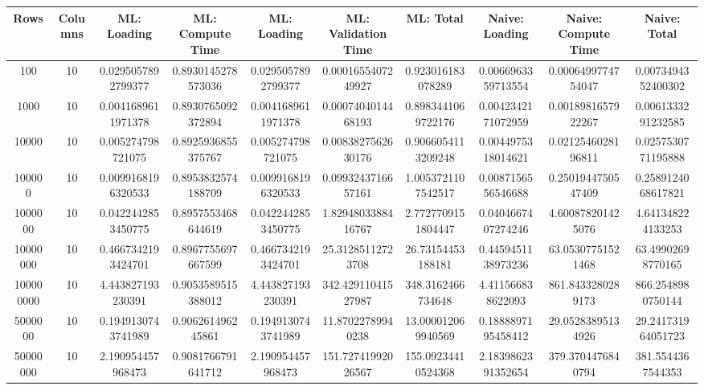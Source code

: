 \begin{table}[htb]
    \centering
    \begin{tabular}{@{}cccccccccc@{}}
        \toprule
        Rows & Columns & ML: Loading & ML: Compute Time & ML: Loading & ML: Validation Time & ML: Total & Naive: Loading & Naive: Compute Time & Naive: Total \\
        \midrule
        100 & 10 & 0.0295057892799377 & 0.8930145278573036 & 0.0295057892799377 & 0.0001655407249927 & 0.923016183078289 & 0.0066963359713554 & 0.0006499774754047 & 0.0073494352400302 \\
        1000 & 10 & 0.0041689611971378 & 0.8930765092372894 & 0.0041689611971378 & 0.0007404014468193 & 0.8983441069722176 & 0.0042342171072959 & 0.0018981657922267 & 0.0061333291232585 \\
        10000 & 10 & 0.005274798721075 & 0.8925936855375767 & 0.005274798721075 & 0.0083827562630176 & 0.9066054113209248 & 0.0044975318014621 & 0.0212546028196811 & 0.0257530771195888 \\
        100000 & 10 & 0.0099168196320533 & 0.8953832574188709 & 0.0099168196320533 & 0.0993243716657161 & 1.0053721107542517 & 0.0087156556546688 & 0.2501944750547409 & 0.2589124068617821 \\
        1000000 & 10 & 0.0422442853450775 & 0.8957553468644619 & 0.0422442853450775 & 1.8294803388416767 & 2.7727709151804447 & 0.0404667407274246 & 4.600878201425076 & 4.641348224133253 \\
        10000000 & 10 & 0.4667342193424701 & 0.8967755697667599 & 0.4667342193424701 & 25.31285112723708 & 26.73154453188181 & 0.4459451138973236 & 63.05307751521468 & 63.49902698770165 \\
        100000000 & 10 & 4.443827193230391 & 0.9053589515388012 & 4.443827193230391 & 342.42911041527987 & 348.3162466734648 & 4.411566838622093 & 861.8433280289173 & 866.2548980750144 \\
        5000000 & 10 & 0.1949130743741989 & 0.906261496245861 & 0.1949130743741989 & 11.87022789940238 & 13.000012069940569 & 0.1888897195458412 & 29.05283895134926 & 29.241731964051723 \\
        50000000 & 10 & 2.190954457968473 & 0.9081766791641712 & 2.190954457968473 & 151.72741992026567 & 155.09234410524368 & 2.1839862391352654 & 379.3704476840794 & 381.5544367544353 \\
        \bottomrule
    \end{tabular}
\end{table}